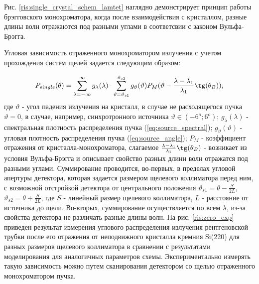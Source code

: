 Рис. \ref{ris:single_crystal_schem_lamtet} наглядно демонстрирует принцип работы
брэгговского монохроматора, когда после взаимодействия с кристаллом, разные
длины волн отражаются под разными углами в соответсвии с законом Вульфа-Брэгга.

Угловая зависимость отраженного монохроматором излучения с учетом прохождения
систем щелей задается следующим образом:

\begin{equation} \label{eq:p_single_crystal}
  P_{single}(\theta) = \sum_{\lambda = -\infty}^{\infty}g_{\lambda}(\lambda) \cdot \sum_{\vartheta = \vartheta_{s1}}^{\vartheta_{s2}}
  g_{\vartheta}(\vartheta) P_M(\vartheta - \frac{\lambda - \lambda_1}{\lambda_1}\tg(\theta_B)),
 \end{equation}
\noindent
где $\vartheta$ - угол падения излучения на кристалл, в случае не расходящегося пучка $\vartheta = 0$, в
случае, например, синхротронного источника $\vartheta \in (-6^o; 6^o) $; $g_{\lambda}(\lambda)$
- спектральная плотность распределения пучка (\ref{eq:source_spectral}); $g_{\vartheta}(\vartheta)$ - угловая плотность
распределения пучка (\ref{eq:source_angle}); $P_M$ - коэффициент отражения от кристалла-монохроматора,
слагаемое $\frac{\lambda - \lambda_1}{\lambda_1}\tg(\theta_B)$ - возникает из
условия Вульфа-Брэгга и описывает свойство разных длинн волн отражатся под разными углами.
 Суммирование проводится, во-первых, в пределах угловой апертуры детектора, которая задается размером
 щелевого коллиматора перед ним, с возможной отстройкой детектора от центрального положения
  $\vartheta_{s1} = \theta - \frac{S}{2L}$, $\vartheta_{s2} = \theta + \frac{S}{2L}$, где
   $S $ - линейный размер щелевого коллиматора, $L$ - расстояние от источника до щели.
 Во-вторых, суммирование осуществляется по всем $\lambda$, из-за свойства детектора не различать разные длины волн.
На рис. \ref{ris:zero_exp} приведен результат измерения углового распределения излучения рентгеновской трубки
после его отражения от неподвижного кристалла кремния Si(220) для разных размеров щелевого коллиматора
в сравнении с результатами моделирования для аналогичных параметров схемы.
Экспериментально измерять такую зависимость можно путем сканирования
детектором со щелью отраженного монохроматором пучка.
